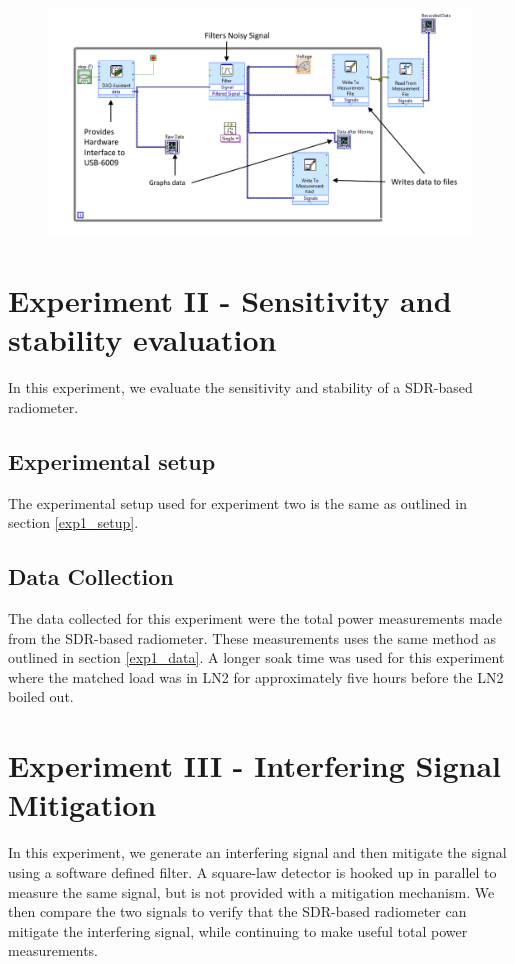 {\begin{figure}[h!tb] \centering
\includegraphics[width=\textwidth]{Images/labview_diagram.pdf}
\label{labviewblock}
\end{figure}
}

\section{Experiment II - Sensitivity and stability evaluation}\label{Exp2}

In this experiment, we evaluate the sensitivity and stability of a SDR-based radiometer.    

\subsection{Experimental setup} \label{exp2_setup}
The experimental setup used for experiment two is the same as outlined in section \ref{exp1_setup}.  

\subsection{Data Collection}
The data collected for this experiment were the total power measurements made from the SDR-based radiometer.  These measurements uses the same method as outlined in section \ref{exp1_data}.  A longer soak time was used for this experiment where the matched load was in LN2 for approximately five hours before the LN2 boiled out.  

\section{Experiment III - Interfering Signal Mitigation}\label{Exp3}

In this experiment, we generate an interfering signal and then mitigate the signal using a software defined filter.  A square-law detector is hooked up in parallel to measure the same signal, but is not provided with a mitigation mechanism.  We then compare the two signals to verify that the SDR-based radiometer can mitigate the interfering signal, while continuing to make useful total power measurements.

